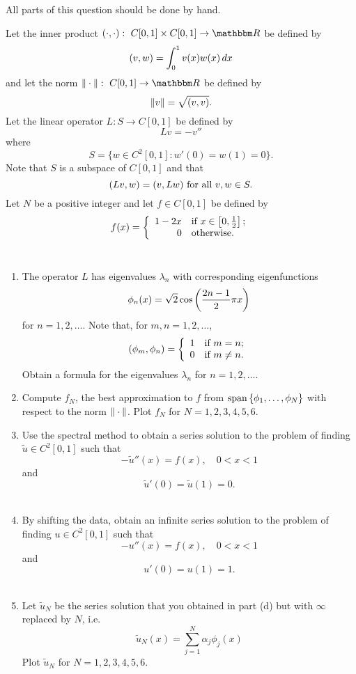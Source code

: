 
All parts of this question should be done by hand.

Let the inner product $\ip{\cdot,\cdot}:\mbox{ }C[0,1]\times C[0,1]\rightarrow\R$ be defined by
\[
(v,w)=\int_0^1v(x)w(x)\,dx
\]
and let the norm $\norm{\cdot}:\mbox{ }C[0,1]\rightarrow\R$ be defined by
\[
\|v\|=\sqrt{(v,v)}.
\]
Let the linear operator $L: S\to C[0,1]$ be defined by
\[
L v = -v''
\]
where
\[
S = \{ w \in C^2[0,1] : w'(0) = w(1) = 0\}.
\]
Note that $S$ is a subspace of $C[0,1]$ and that
\[
(Lv,w)=(v,Lw)\mbox{ for all }v,w\in S.
\]
Let $N$ be a positive integer and let $f\in C[0,1]$ be defined by
\[
f(x)=\left\{\begin{array}{rl}1-2x&\mbox{if }x\in\left[0,{1\over2}\right];\\0&\mbox{otherwise}.\end{array}\right.
\]
\\
\begin{enumerate}
\item The operator $L$ has eigenvalues $\lambda_n$ with corresponding eigenfunctions
\[
\phi_n(x) = \sqrt{2} \cos\left({2n-1\over 2}\pi x\right)
\]
for $n=1,2,\ldots$. Note that, for $m,n=1,2,\ldots$,
\[
(\phi_m,\phi_n)=\left\{\begin{array}{rl}1&\mbox{if }m=n;\\0&\mbox{if }m\ne n.\end{array}\right.
\]
Obtain a formula for the eigenvalues $\lambda_n$ for $n=1,2,\ldots$.
\\
\item Compute $f_N$, the best approximation to $f$ from ${\rm span}\left\{\phi_1,\ldots,\phi_N\right\}$ with respect to the norm $\|\cdot\|$.  Plot $f_N$ for $N = 1,2,3,4,5,6$.
\\
\item Use the spectral method to obtain a series solution to the problem of finding $\tilde{u}\in C^2[0,1]$ such that
\[
-\tilde{u}''(x) = f(x),\quad 0<x<1
\]
and
\[
\tilde{u}'(0) = \tilde{u}(1) = 0.
\]
\\
\item By shifting the data, obtain an infinite series solution to the problem of finding $u\in C^2[0,1]$ such that
\[
-u''(x) = f(x),\quad 0<x<1
\]
and
\[
u'(0) = u(1) = 1.
\]
\\
\item Let $\tilde{u}_N$ be the series solution that you obtained in part (d) but with $\infty$ replaced by $N$, i.e.
\[
\tilde{u}_N(x) = \sum_{j = 1}^N \alpha_j \phi_j(x)
\]
Plot $\tilde{u}_N$ for $N=1,2,3,4,5,6$.

\end{enumerate}




